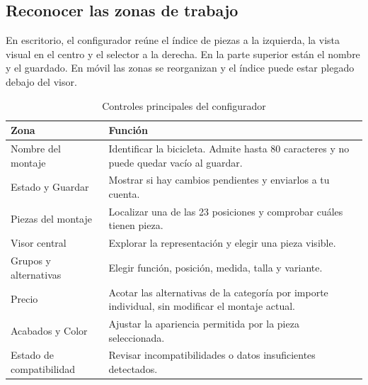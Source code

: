 \documentclass[12pt,letterpaper]{article}
\newenvironment{tabla}{\begingroup\singlespacing\small\setlength{\tabcolsep}{5pt}\renewcommand{\arraystretch}{1.25}}{\endgroup}
\begin{document}
\subsection{Reconocer las zonas de trabajo}
En escritorio, el configurador reúne el índice de piezas a la izquierda, la vista visual en el centro y el selector a la derecha. En la parte superior están el nombre y el guardado. En móvil las zonas se reorganizan y el índice puede estar plegado debajo del visor.

\begin{table}[H]\caption{Controles principales del configurador}\label{tab:zonas}\begin{tabla}\begin{tabularx}{\textwidth}{L{4cm}X}\toprule
Zona & Función\\\midrule
Nombre del montaje & Identificar la bicicleta. Admite hasta 80 caracteres y no puede quedar vacío al guardar.\\
Estado y Guardar & Mostrar si hay cambios pendientes y enviarlos a tu cuenta.\\
Piezas del montaje & Localizar una de las 23 posiciones y comprobar cuáles tienen pieza.\\
Visor central & Explorar la representación y elegir una pieza visible.\\
Grupos y alternativas & Elegir función, posición, medida, talla y variante.\\
Precio & Acotar las alternativas de la categoría por importe individual, sin modificar el montaje actual.\\
Acabados y Color & Ajustar la apariencia permitida por la pieza seleccionada.\\
Estado de compatibilidad & Revisar incompatibilidades o datos insuficientes detectados.\\\bottomrule
\end{tabularx}\end{tabla}\end{table}
\end{document}
